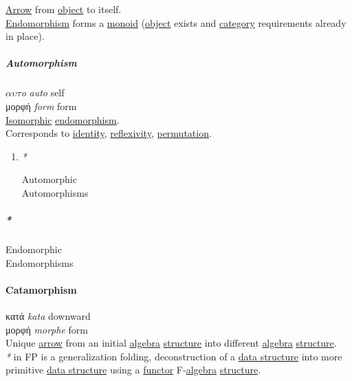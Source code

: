 \documentclass[11pt]{article}
\begin{document}
\hyperref[org5b6e6e9]{Arrow} from \hyperref[org025aac8]{object} to itself.\\
\hyperref[org67037d9]{Endomorphism} forms a \hyperref[org8ff50ea]{monoid} (\hyperref[org025aac8]{object} exists and \hyperref[org3e3a79b]{category} requirements already in place).\\

\subparagraph{\label{org32af9c0}Automorphism}
\label{sec:orgdd91eab}
\(\alpha \upsilon \tau\)\textit{o} \emph{auto} self\\
μορφή \emph{form} form\\

\hyperref[org6d62cf4]{Isomorphic} \hyperref[org67037d9]{endomorphism}.\\

Corresponds to \hyperref[org3bbbadd]{identity}, \hyperref[orge2dcddf]{reflexivity}, \hyperref[orga04f0ff]{permutation}.\\

\begin{enumerate}
\item \emph{*}
\label{sec:org5600782}

\label{org5d67c50}Automorphic\\
\label{org780bc95}Automorphisms\\
\end{enumerate}

\subparagraph{\emph{*}}
\label{sec:org64e613d}

\label{org1eb3b82}Endomorphic\\
\label{org25ef145}Endomorphisms\\

\paragraph{\label{org9f46ed9}Catamorphism}
\label{sec:orge02a061}
κατά \emph{kata} downward\\
μορφή \emph{morphe} form\\

Unique \hyperref[org5b6e6e9]{arrow} from an initial \hyperref[orgecde2fc]{algebra} \hyperref[org93ee82c]{structure} into different \hyperref[orgecde2fc]{algebra} \hyperref[org93ee82c]{structure}.\\

\emph{*} in FP is a generalization folding, deconstruction of a \hyperref[org47669ca]{data structure} into more primitive \hyperref[org47669ca]{data structure} using a \hyperref[org6073683]{functor} F-\hyperref[orgecde2fc]{algebra} \hyperref[org93ee82c]{structure}.\\
\end{document}
